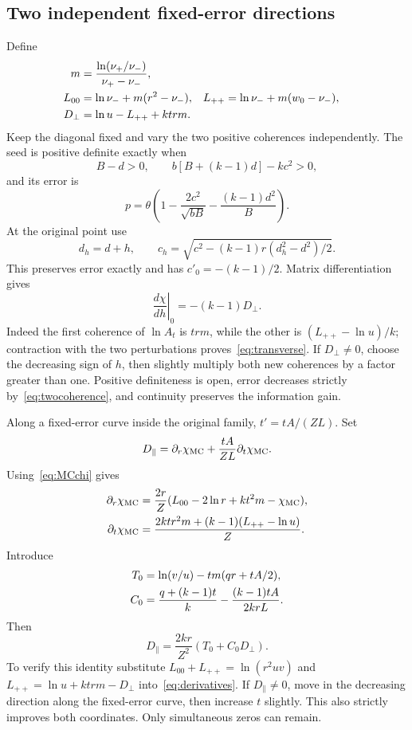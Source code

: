\documentclass[12pt,letterpaper,onecolumn]{article}
\theoremstyle{definition}
\theoremstyle{remark}
\begin{document}
\subsection{Two independent fixed-error directions}
Define
\begin{align}
m&=\frac{\ln(\nu_+/\nu_-)}{\nu_+-\nu_-},\notag\\
L_{00}&=\ln\nu_-+m(r^2-\nu_-),&
L_{++}&=\ln\nu_-+m(w_0-\nu_-),\label{eq:logs}\\
D_\perp&=\ln u-L_{++}+ktrm.\notag
\end{align}
Keep the diagonal fixed and vary the two positive coherences independently. The seed is positive definite exactly when
\[
B-d>0,\qquad b[B+(k-1)d]-kc^2>0,
\]
and its error is
\begin{equation}\label{eq:twocoherence}
p=\theta\left(1-\frac{2c^2}{\sqrt{bB}}-\frac{(k-1)d^2}{B}\right).
\end{equation}
At the original point use
\[
d_h=d+h,\qquad c_h=\sqrt{c^2-(k-1)r(d_h^2-d^2)/2}.
\]
This preserves error exactly and has \(c'_0=-(k-1)/2\). Matrix differentiation gives
\begin{equation}\label{eq:transverse}
\left.\frac{d\chi}{dh}\right|_{0}=-(k-1)D_\perp.
\end{equation}
Indeed the first coherence of \(\ln A_t\) is \(trm\), while the other is \((L_{++}-\ln u)/k\); contraction with the two perturbations proves~\eqref{eq:transverse}.
If \(D_\perp\ne0\), choose the decreasing sign of \(h\), then slightly multiply both new coherences by a factor greater than one. Positive definiteness is open, error decreases strictly by~\eqref{eq:twocoherence}, and continuity preserves the information gain.

Along a fixed-error curve inside the original family, \(t'=tA/(ZL)\). Set
\[
D_\parallel=\partial_r\chi_{\rm MC}+\frac{tA}{ZL}\partial_t\chi_{\rm MC}.
\]
Using~\eqref{eq:MCchi} gives
\begin{align}
\partial_r\chi_{\rm MC}
&=\frac{2r}{Z}(L_{00}-2\ln r+kt^2m-\chi_{\rm MC}),\notag\\
\partial_t\chi_{\rm MC}
&=\frac{2ktr^2m+(k-1)(L_{++}-\ln u)}Z.\label{eq:derivatives}
\end{align}
Introduce
\begin{align}
T_0&=\ln(v/u)-tm(qr+tA/2),\notag\\
C_0&=\frac{q+(k-1)t}{k}-\frac{(k-1)tA}{2krL}.\notag
\end{align}
Then
\begin{equation}\label{eq:coupled}
D_\parallel=\frac{2kr}{Z^2}(T_0+C_0D_\perp).
\end{equation}
To verify this identity substitute
\(L_{00}+L_{++}=\ln(r^2uv)\) and
\(L_{++}=\ln u+ktrm-D_\perp\) into~\eqref{eq:derivatives}.
If \(D_\parallel\ne0\), move in the decreasing direction along the fixed-error curve, then increase \(t\) slightly. This also strictly improves both coordinates. Only simultaneous zeros can remain.
\end{document}
